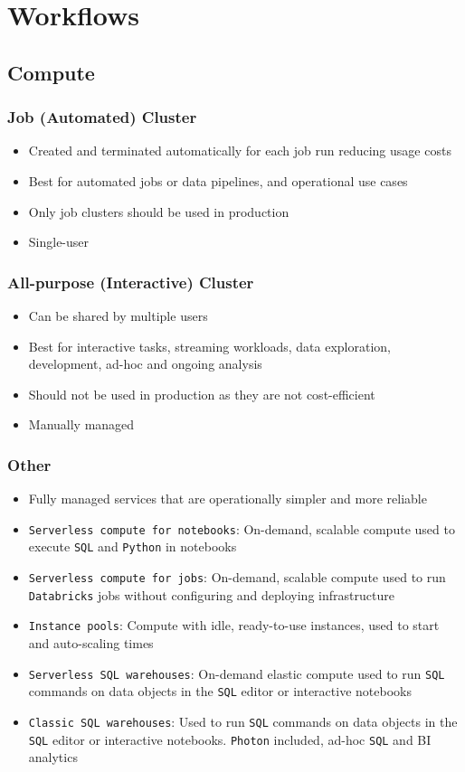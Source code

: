 \documentclass[11pt]{scrartcl}
\begin{document}
\newpage
\section{Workflows}
\subsection{Compute}
\subsubsection{Job (Automated) Cluster}
\begin{itemize}
	\item Created and terminated automatically for each job run reducing usage costs
	\item Best for automated jobs or data pipelines, and operational use cases
	\item Only job clusters should be used in production
	\item Single-user
\end{itemize}

\subsubsection{All-purpose (Interactive) Cluster}
\begin{itemize}
	\item Can be shared by multiple users
	\item Best for interactive tasks, streaming workloads, data exploration, development, ad-hoc and ongoing analysis
	\item Should not be used in production as they are not cost-efficient
	\item Manually managed
\end{itemize}

\subsubsection{Other}
\begin{itemize}
	\item Fully managed services that are operationally simpler and more reliable
	\item \texttt{Serverless compute for notebooks}: On-demand, scalable compute used to execute \texttt{SQL} and \texttt{Python} in notebooks
	\item \texttt{Serverless compute for jobs}: On-demand, scalable compute used to run \texttt{Databricks} jobs without configuring and deploying infrastructure
	\item \texttt{Instance pools}: Compute with idle, ready-to-use instances, used to start and auto-scaling times
	\item \texttt{Serverless SQL warehouses}: On-demand elastic compute used to run \texttt{SQL} commands on data objects in the \texttt{SQL} editor or interactive notebooks  
	\item \texttt{Classic SQL warehouses}: Used to run \texttt{SQL} commands on data objects in the \texttt{SQL} editor or interactive notebooks. \texttt{Photon} included, ad-hoc \texttt{SQL} and BI analytics
\end{itemize}
\end{document}
